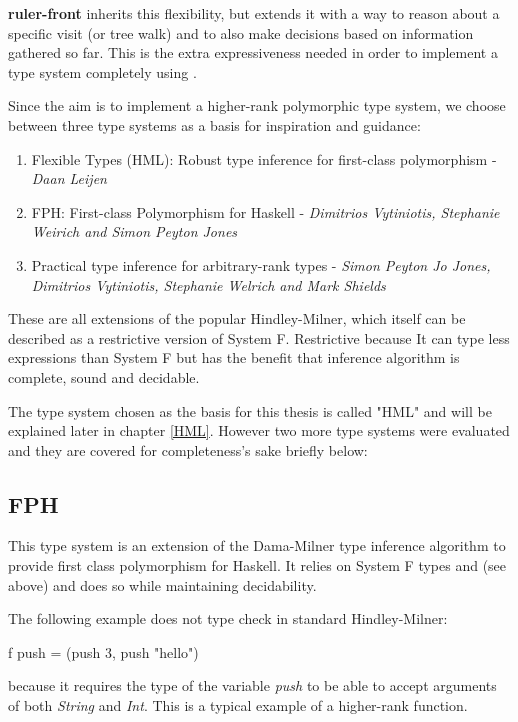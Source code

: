 \textbf{ruler-front} inherits this flexibility, but extends it with a way to reason about a specific visit (or tree walk) and to also make decisions based on information gathered so far. This is the extra expressiveness needed in order to implement a type system completely using \ags.

Since the aim is to implement a higher-rank polymorphic type system, we choose between three type systems as a basis for inspiration and guidance:

\begin{enumerate}
\item Flexible Types (HML): Robust type inference for first-class polymorphism - \textit{Daan Leijen}
\item FPH: First-class Polymorphism for Haskell - \textit{Dimitrios Vytiniotis, Stephanie Weirich and Simon Peyton Jones}
\item Practical type inference for arbitrary-rank types - \textit{Simon Peyton Jo Jones, Dimitrios Vytiniotis, Stephanie Welrich and Mark Shields}
\end{enumerate}

These are all extensions of the popular Hindley-Milner, which itself can be described as a restrictive version of System F. Restrictive because It can type less expressions than System F but has the benefit that inference algorithm is complete, sound and decidable.

The type system chosen as the basis for this thesis is called "HML" and will be explained later in chapter \ref{HML}. However two more type systems were evaluated and they are covered for completeness's sake briefly below:

\subsection{FPH\cite{FPH}}
This type system is an extension of the Dama-Milner type inference algorithm to provide first class polymorphism for Haskell. It relies on System F types and (see above) and does so while maintaining decidability. 

The following example does not type check in standard Hindley-Milner:
\begin{code}
f push = (push 3, push "hello")
\end{code}

because it requires the type of the variable \textit{push} to be able to accept arguments of both \textit{String} and \textit{Int}. This is a typical example of a higher-rank function. 

